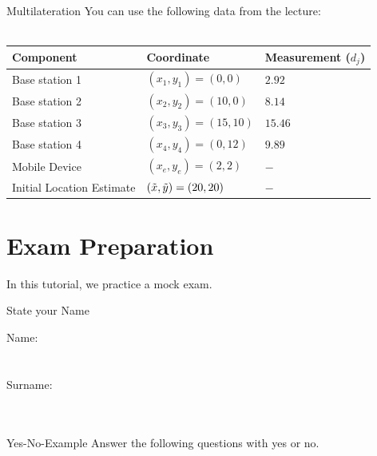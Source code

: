 \documentclass[twoside]{article}
\begin{document}
\begin{task}{Multilateration}{}{}
\clearpage
You can use the following data from the lecture:\\
\\
\begin{tabularx}{0.8\textwidth} { 
  | >{\raggedright\arraybackslash}X 
  | >{\raggedright\arraybackslash}X 
  | >{\raggedright\arraybackslash}X | }
 \hline
 \textbf{Component} & \textbf{Coordinate} & \textbf{Measurement} ($d_{j}$) \\
 \hline
 Base station 1  & $(x_{1}, y_{1}) = (0, 0)$  & $2.92$ \\
 \hline
 Base station 2  & $(x_{2}, y_{2}) = (10, 0)$  & $8.14$ \\
 \hline
 Base station 3  & $(x_{3}, y_{3}) = (15, 10)$  & $15.46$ \\
 \hline
 Base station 4  & $(x_{4}, y_{4}) = (0, 12)$  & $9.89$ \\
 \hline
 Mobile Device  & $(x_{e}, y_{e}) = (2, 2)$  & $-$ \\
 \hline
 Initial Location Estimate  & $(\Tilde{x}, \Tilde{y}) = (20, 20)$  & $-$ \\
\hline
\end{tabularx}

\end{task}


\newpage
\section{Exam Preparation}

In this tutorial, we practice a mock exam.

\vspace{10pt}

\begin{task}{State your Name}{}{}

Name: \\
 \\
 \\
Surname: \\
 \\
 \\

\end{task}

\begin{task}{Yes-No-Example}{}{}
Answer the following questions with yes or no. \\

\begin{yesnolist}
\end{yesnolist}
\end{task}
\end{document}
